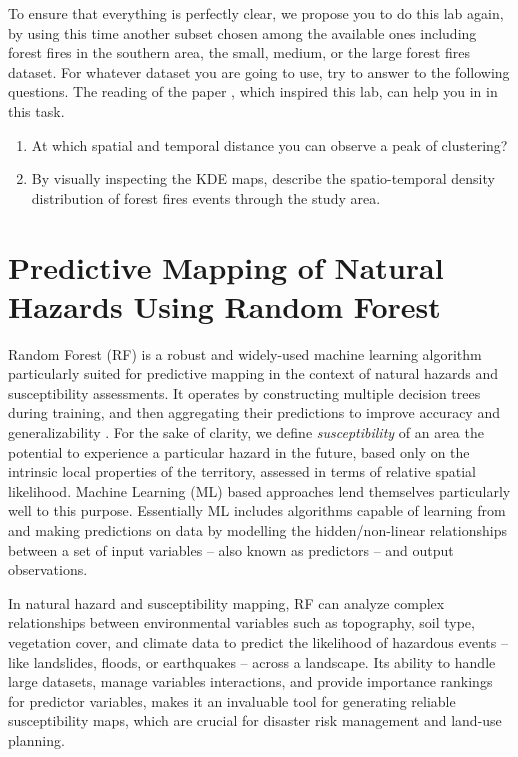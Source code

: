 \documentclass[
]{article}
\begin{document}
To ensure that everything is perfectly clear, we propose you to do this lab again, by using this time another subset chosen among the available ones including forest fires in the southern area, the small, medium, or the large forest fires dataset.
For whatever dataset you are going to use, try to answer to the following questions.
The reading of the paper \citep{tonini_evolution_2017}, which inspired this lab, can help you in in this task.

\begin{enumerate}
\def\labelenumi{\arabic{enumi}.}
\item
  At which spatial and temporal distance you can observe a peak of clustering?
\item
  By visually inspecting the KDE maps, describe the spatio-temporal density distribution of forest fires events through the study area.
\end{enumerate}

\section{Predictive Mapping of Natural Hazards Using Random Forest}\label{global-rf}

Random Forest (RF) is a robust and widely-used machine learning algorithm particularly suited for predictive mapping in the context of natural hazards and susceptibility assessments.
It operates by constructing multiple decision trees during training, and then aggregating their predictions to improve accuracy and generalizability \citep{breiman_random_2001}.
For the sake of clarity, we define \emph{susceptibility} of an area the potential to experience a particular hazard in the future, based only on the intrinsic local properties of the territory, assessed in terms of relative spatial likelihood.
Machine Learning (ML) based approaches lend themselves particularly well to this purpose.
Essentially ML includes algorithms capable of learning from and making predictions on data by modelling the hidden/non-linear relationships between a set of input variables -- also known as predictors -- and output observations.

In natural hazard and susceptibility mapping, RF can analyze complex relationships between environmental variables such as topography, soil type, vegetation cover, and climate data to predict the likelihood of hazardous events -- like landslides, floods, or earthquakes -- across a landscape.
Its ability to handle large datasets, manage variables interactions, and provide importance rankings for predictor variables, makes it an invaluable tool for generating reliable susceptibility maps, which are crucial for disaster risk management and land-use planning.
\end{document}
